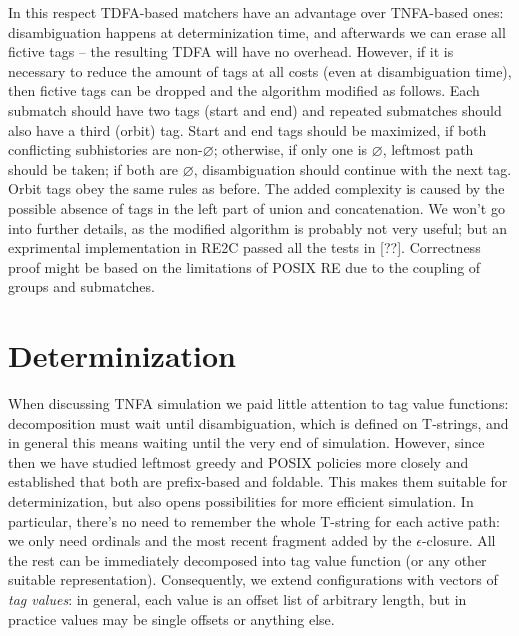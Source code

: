 \documentclass{article}
\theoremstyle{definition}
\begin{document}
\begin{multicols}{2}
In this respect TDFA-based matchers have an advantage over TNFA-based ones:
disambiguation happens at determinization time,
and afterwards we can erase all fictive tags -- the resulting TDFA will have no overhead.
However, if it is necessary to reduce the amount of tags at all costs (even at disambiguation time),
then fictive tags can be dropped and the algorithm modified as follows.
Each submatch should have two tags (start and end)
and repeated submatches should also have a third (orbit) tag.
Start and end tags should be maximized, if both conflicting subhistories are non-$\varnothing$;
otherwise, if only one is $\varnothing$, leftmost path should be taken;
if both are $\varnothing$, disambiguation should continue with the next tag.
Orbit tags obey the same rules as before.
The added complexity is caused by the possible absence of tags in the left part of union and concatenation.
We won't go into further details, as the modified algorithm is probably not very useful;
but an exprimental implementation in RE2C passed all the tests in [??].
Correctness proof might be based on the limitations of POSIX RE due to the coupling of groups and submatches.

\section{Determinization}\label{section_determinization}

When discussing TNFA simulation we paid little attention to tag value functions:
decomposition must wait until disambiguation, which is defined on T-strings,
and in general this means waiting until the very end of simulation.
However, since then we have studied leftmost greedy and POSIX policies more closely
and established that both are prefix-based and foldable.
This makes them suitable for determinization, but also opens possibilities for more efficient simulation.
In particular, there's no need to remember the whole T-string for each active path:
we only need ordinals and the most recent fragment added by the $\epsilon$-closure.
All the rest can be immediately decomposed into tag value function (or any other suitable representation).
Consequently, we extend configurations with vectors of \emph{tag values}:
in general, each value is an offset list of arbitrary length,
but in practice values may be single offsets or anything else.
\\


\end{multicols}
\end{document}
